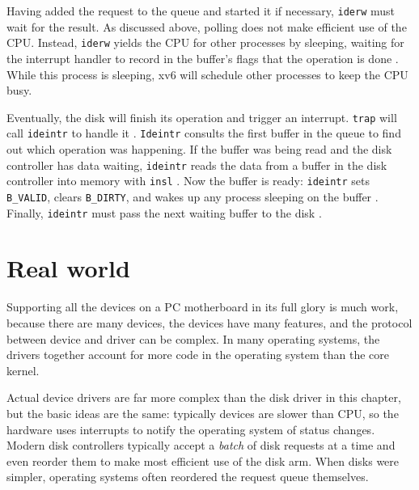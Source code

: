 Having added the request to the queue and started it if necessary,
\lstinline{iderw}
must wait for the result.  As discussed above,
polling does not make efficient use of the CPU.
Instead,
\lstinline{iderw}
yields the CPU for other processes by sleeping,
waiting for the interrupt handler to 
record in the buffer's flags that the operation is done
.
While this process is sleeping,
xv6 will schedule other processes to keep the CPU busy.

Eventually, the disk will finish its operation and trigger an interrupt.
\lstinline{trap}
will call
\lstinline{ideintr}
to handle it
.
\lstinline{Ideintr}
consults the first buffer in the queue to find
out which operation was happening.
If the buffer was being read and the disk controller has data waiting,
\lstinline{ideintr}
reads the data from a buffer in the disk controller
into memory with
\lstinline{insl}
.
Now the buffer is ready:
\lstinline{ideintr}
sets 
\lstinline{B_VALID},
clears
\lstinline{B_DIRTY},
and wakes up any process sleeping on the buffer
.
Finally,
\lstinline{ideintr}
must pass the next waiting buffer to the disk
.
\section{Real world}
Supporting all the devices on a PC motherboard in its full glory is much work,
because there are many devices, the devices have many features, and the protocol
between device and driver can be complex.  In many operating systems, the
drivers together account for more code in the operating system than the core
kernel.

Actual device drivers are far more complex than the disk driver in this chapter,
but the basic ideas are the same:
typically devices are slower than CPU, so the hardware uses
interrupts to notify the operating system of status changes.
Modern disk controllers typically
accept a 
\textit{batch} 
of disk requests at a time and even reorder
them to make most efficient use of the disk arm.
When disks were simpler, operating systems often reordered the
request queue themselves.

